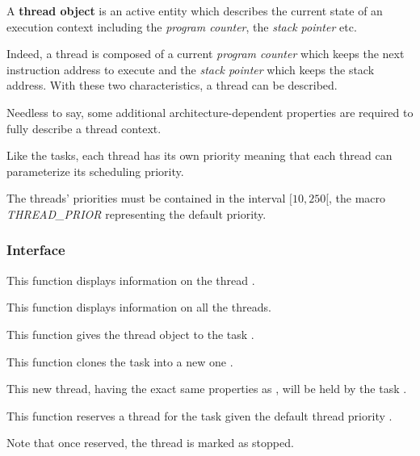 A \textbf{thread object} is an active entity which describes the
current state of an execution context including the \textit{program counter},
the \textit{stack pointer} etc.

Indeed, a thread is composed of a current \textit{program counter} which
keeps the next instruction address to execute and the \textit{stack pointer}
which keeps the stack address. With these two characteristics, a thread
can be described.

Needless to say, some additional architecture-dependent properties are
required to fully describe a thread context.

Like the tasks, each thread has its own priority meaning that each thread
can parameterize its scheduling priority.

The threads' priorities must be contained in the interval $[10, 250[$, the
macro \textit{THREAD\_PRIOR} representing the default priority.

%
%

\subsubsection{Interface}

	 {
	   This function displays information on the thread .
	 }

	 {
	   This function displays information on all the threads.
	 }

	 {
	   This function gives the thread object  to the
	   task .
	 }

	 {
	   This function clones the task  into a new one
	   .

	   This new thread, having the exact same properties as ,
	   will be held by the task .
	 }

	 {
	   This function reserves a thread for the task 
	   given the default thread priority .

	   Note that once reserved, the thread is marked as stopped.
	 }

